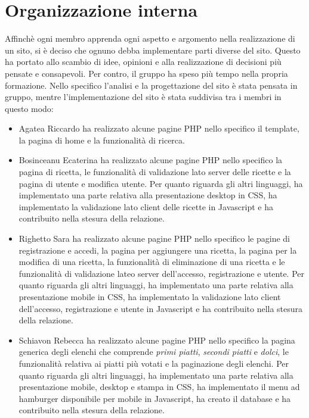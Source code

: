 \section{Organizzazione interna}
Affinchè ogni membro apprenda ogni aspetto e argomento nella realizzazione di un sito, si è deciso che ognuno debba implementare parti diverse del sito. Questo ha portato allo scambio di idee, opinioni e alla realizzazione di decisioni più pensate e consapevoli. Per contro, il gruppo ha speso più tempo nella propria formazione. \newline
Nello specifico l'analisi e la progettazione del sito è stata pensata in gruppo, mentre l'implementazione del sito è stata suddivisa tra i membri in questo modo:
\begin{itemize}
	\item Agatea Riccardo ha realizzato alcune pagine PHP nello specifico il template, la pagina di home e la funzionalità di ricerca. %
	\item Bosinceanu Ecaterina ha realizzato alcune pagine PHP nello specifico la pagina di ricetta, le funzionalità di validazione lato server delle ricette e la pagina di utente e modifica utente. Per quanto riguarda gli altri linguaggi, ha implementato una parte relativa alla presentazione desktop in CSS, ha implementato la validazione lato client delle ricette in Javascript e ha contribuito nella stesura della relazione. 
	\item Righetto Sara ha realizzato alcune pagine PHP nello specifico le pagine di registrazione e accedi, la pagina per aggiungere una ricetta, la pagina per la modifica di una ricetta, la funzionalità di eliminazione di una ricetta e le funzionalità di validazione lateo server dell'accesso, registrazione e utente. Per quanto riguarda gli altri linguaggi, ha implementato una parte relativa alla presentazione mobile in CSS, ha implementato la validazione lato client dell'accesso, registrazione e utente in Javascript e ha contribuito nella stesura della relazione. 
	\item Schiavon Rebecca ha realizzato alcune pagine PHP nello specifico la pagina generica degli elenchi che comprende \textit{primi piatti}, \textit{secondi piatti} e \textit{dolci}, le funzionalità relativa ai piatti più votati e la paginazione degli elenchi. Per quanto riguarda gli altri linguaggi, ha implementato una parte relativa alla presentazione mobile, desktop e stampa in CSS, ha implementato il menu ad hamburger disponibile per mobile in Javascript, ha creato il database e ha contribuito nella stesura della relazione. 
\end{itemize}
